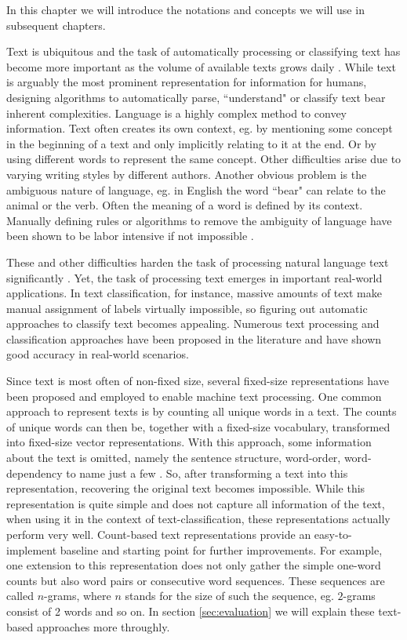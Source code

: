 In this chapter we will introduce the notations and concepts we will use in subsequent chapters.


Text is ubiquitous and the task of automatically processing or classifying text has become more important as the volume of available texts grows daily \cite{Joachims1998}.
While text is arguably the most prominent representation for information for humans, designing algorithms to automatically parse, ``understand" or classify text bear inherent complexities.
Language is a highly complex method to convey information. 
Text often creates its own context, eg. by mentioning some concept in the beginning of a text and only implicitly relating to it at the end. Or by using different words to represent the same concept.
Other difficulties arise due to varying writing styles by different authors.
Another obvious problem is the ambiguous nature of language\cite{Britton1978}, eg. in English the word ``bear" can relate to the animal or the verb.
Often the meaning of a word is defined by its context.
Manually defining rules or algorithms to remove the ambiguity of language have been shown to be labor intensive if not impossible \cite[p.~11]{Weikum2002}.

These and other difficulties harden the task of processing natural language text significantly \cite{Chowdhury2003,Weikum2002}.
Yet, the task of processing text emerges in important real-world applications.
In text classification, for instance, massive amounts of text make manual assignment of labels virtually impossible, so figuring out automatic approaches to classify text becomes appealing.
Numerous text processing and classification approaches have been proposed in the literature and have shown good accuracy in real-world scenarios.

Since text is most often of non-fixed size, several fixed-size representations have been proposed and employed to enable machine text processing.
One common approach to represent texts is by counting all unique words in a text. The counts of unique words can then be, together with a fixed-size vocabulary, transformed into fixed-size vector representations.
With this approach, some information about the text is omitted, namely the sentence structure, word-order, word-dependency to name just a few \cite{Chowdhury2003}.
So, after transforming a text into this representation, recovering the original text becomes impossible.
While this representation is quite simple and does not capture all information of the text, when using it in the context of text-classification, these representations actually perform very well.
Count-based text representations provide an easy-to-implement baseline and starting point for further improvements.
For example, one extension to this representation does not only gather the simple one-word counts but also word pairs or consecutive word sequences. These sequences are called $n$-grams, where $n$ stands for the size of such the sequence, eg. $2$-grams consist of 2 words and so on.
In section \ref{sec:evaluation} we will explain these text-based approaches more throughly.

